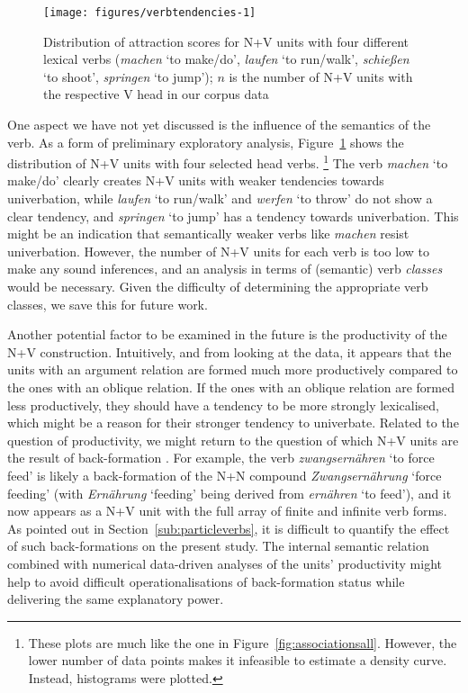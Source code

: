 \documentclass[biblatex, charis, linguex]{glossa}\usepackage{knitr}
\begin{document}
\begin{figure}[htbp]

{\centering \texttt{[image: figures/verbtendencies-1]} 

}

\caption[Distribution of attraction scores for N+V units with four different lexical verbs (\textit{machen} `to make\slash do', \textit{laufen} `to run\slash walk', \textit{schießen} `to shoot', \textit{springen} `to jump')]{Distribution of attraction scores for N+V units with four different lexical verbs (\textit{machen} `to make\slash do', \textit{laufen} `to run\slash walk', \textit{schießen} `to shoot', \textit{springen} `to jump'); $n$ is the number of N+V units with the respective V head in our corpus data}\label{fig:verbtendencies}
\end{figure}


One aspect we have not yet discussed is the influence of the semantics of the verb.
As a form of preliminary exploratory analysis, Figure~\ref{fig:verbtendencies} shows the distribution of N+V units with four selected head verbs.%
\footnote{These plots are much like the one in Figure~\ref{fig:associationsall}.
However, the lower number of data points makes it infeasible to estimate a density curve.
Instead, histograms were plotted.}
The verb \textit{machen} `to make\slash do' clearly creates N+V units with weaker tendencies towards univerbation, while \textit{laufen} `to run\slash walk' and \textit{werfen} `to throw' do not show a clear tendency, and \textit{springen} `to jump' has a tendency towards univerbation.
This might be an indication that semantically weaker verbs like \textit{machen} resist univerbation.
However, the number of N+V units for each verb is too low to make any sound inferences, and an analysis in terms of (semantic) verb \textit{classes} would be necessary.
Given the difficulty of determining the appropriate verb classes, we save this for future work.

Another potential factor to be examined in the future is the productivity of the N+V construction.
Intuitively, and from looking at the data, it appears that the units with an argument relation are formed much more productively compared to the ones with an oblique relation.
If the ones with an oblique relation are formed less productively, they should have a tendency to be more strongly lexicalised, which might be a reason for their stronger tendency to univerbate.
Related to the question of productivity, we might return to the question of which N+V units are the result of back-formation \mbox{\parencite{Wurzel1998}}.
For example, the verb \textit{zwangsernähren} `to force feed' is likely a back-formation of the N+N compound \textit{Zwangsernährung} `force feeding' (with \textit{Ernährung} `feeding' being derived from \textit{ernähren} `to feed'), and it now appears as a N+V unit with the full array of finite and infinite verb forms.
As pointed out in Section~\mbox{\ref{sub:particleverbs}}, it is difficult to quantify the effect of such back-formations on the present study.
The internal semantic relation combined with numerical data-driven analyses of the units' productivity might help to avoid difficult operationalisations of back-formation status while delivering the same explanatory power.
\end{document}
